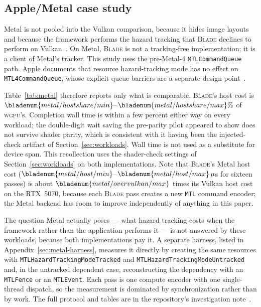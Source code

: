\documentclass[10pt,twocolumn]{article}
\newcommand{\blade}{\textsc{Blade}}
\newcommand{\wgpu}{\textsc{wgpu}}
\begin{document}
\subsection{Apple/Metal case study}
\label{sec:metal}



Metal is not pooled into the Vulkan comparison, because it hides image layouts
and because the framework performs the hazard tracking that \blade{} declines
to perform on Vulkan~\cite{metal-hazard-tracking}. On Metal, \blade{} is not a
tracking-free implementation; it is a client of Metal's tracker. This study
uses the pre-Metal-4 \texttt{MTLCommandQueue} path. Apple documents that
resource hazard-tracking mode has no effect on \texttt{MTL4CommandQueue}, whose
explicit queue barriers are a separate design point~\cite{metal-hazard-tracking}.

Table~\ref{tab:metal} therefore reports only what is comparable. \blade's host
cost is $\bladenum{metal/hostshare/min}$--$\bladenum{metal/hostshare/max}\%$ of
\wgpu's. Completion wall time is within a few percent either way on every
workload; the double-digit wait saving the pre-parity pilot appeared to show
does not survive shader parity, which is consistent with it having been the
injected-check artifact of Section~\ref{sec:workloads}. Wall time is not used
as a substitute for device span. This recollection uses the shader-check settings of
Section~\ref{sec:workloads} on both implementations.
Note that \blade's Metal host cost
($\bladenum{metal/host/min}$--$\bladenum{metal/host/max}\,\mu$s for sixteen
passes) is about $\bladenum{metal/overvulkan/max}$ times its Vulkan host cost
on the RTX~5070, because each \blade{} pass creates a new \texttt{MTL} command
encoder; the Metal backend has room to improve independently of anything in
this paper.

The question Metal actually poses --- what hazard tracking costs when the framework
rather than the application performs it --- is not answered by these workloads,
because both implementations pay it. A separate harness, listed in
Appendix~\ref{sec:metal-harness}, measures it directly by creating the same
resources with \texttt{MTLHazardTrackingModeTracked} and
\texttt{MTLHazardTrackingModeUntracked} and, in the untracked dependent case,
reconstructing the dependency with an \texttt{MTLFence} or an
\texttt{MTLEvent}. Each pass is one compute encoder with one single-thread
dispatch, so the measurement is dominated by synchronization rather than by
work. The full protocol and tables are in the repository's investigation
note~\cite{blade-metal-note}.
\end{document}

